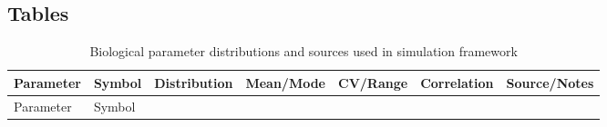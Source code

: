 \documentclass[
  11pt,
]{SCreport}
\begin{document}
\newpage

\begin{landscape}

\section{Tables}\label{sec-tables}

\begin{longtable}[]{@{}
  >{\raggedright\arraybackslash}p{}
  >{\raggedright\arraybackslash}p{}
  >{\raggedright\arraybackslash}p{}
  >{\raggedright\arraybackslash}p{}
  >{\raggedright\arraybackslash}p{}
  >{\raggedright\arraybackslash}p{}
  >{\raggedright\arraybackslash}p{}@{}}
\caption{Biological parameter distributions and sources used in
simulation framework}\label{tbl-bio-params}\tabularnewline
\toprule\noalign{}
\begin{minipage}[b]{\linewidth}\raggedright
Parameter
\end{minipage} & \begin{minipage}[b]{\linewidth}\raggedright
Symbol
\end{minipage} & \begin{minipage}[b]{\linewidth}\raggedright
Distribution
\end{minipage} & \begin{minipage}[b]{\linewidth}\raggedright
Mean/Mode
\end{minipage} & \begin{minipage}[b]{\linewidth}\raggedright
CV/Range
\end{minipage} & \begin{minipage}[b]{\linewidth}\raggedright
Correlation
\end{minipage} & \begin{minipage}[b]{\linewidth}\raggedright
Source/Notes
\end{minipage} \\
\midrule\noalign{}
\endfirsthead
\toprule\noalign{}
\begin{minipage}[b]{\linewidth}\raggedright
Parameter
\end{minipage} & \begin{minipage}[b]{\linewidth}\raggedright
Symbol
\end{minipage} & \begin{minipage}[b]{\linewidth}\raggedright

\end{minipage}
\end{longtable}
\end{landscape}
\end{document}
